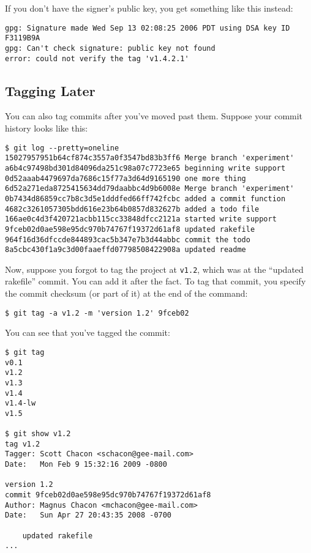 \documentclass[a4paper]{book}
\begin{document}
If you don't have the signer's public key, you get something like this instead:

\begin{shaded}\begin{verbatim}
gpg: Signature made Wed Sep 13 02:08:25 2006 PDT using DSA key ID F3119B9A
gpg: Can't check signature: public key not found
error: could not verify the tag 'v1.4.2.1'
\end{verbatim}\end{shaded}

\subsection{Tagging Later}\label{tagging-later}

You can also tag commits after you've moved past them. Suppose your commit history looks like this:

\begin{shaded}\begin{verbatim}
$ git log --pretty=oneline
15027957951b64cf874c3557a0f3547bd83b3ff6 Merge branch 'experiment'
a6b4c97498bd301d84096da251c98a07c7723e65 beginning write support
0d52aaab4479697da7686c15f77a3d64d9165190 one more thing
6d52a271eda8725415634dd79daabbc4d9b6008e Merge branch 'experiment'
0b7434d86859cc7b8c3d5e1dddfed66ff742fcbc added a commit function
4682c3261057305bdd616e23b64b0857d832627b added a todo file
166ae0c4d3f420721acbb115cc33848dfcc2121a started write support
9fceb02d0ae598e95dc970b74767f19372d61af8 updated rakefile
964f16d36dfccde844893cac5b347e7b3d44abbc commit the todo
8a5cbc430f1a9c3d00faaeffd07798508422908a updated readme
\end{verbatim}\end{shaded}

Now, suppose you forgot to tag the project at \texttt{v1.2}, which was at the “updated rakefile” commit. You can add it after the fact. To tag that commit, you specify the commit checksum (or part of it) at the end of the command:

\begin{shaded}\begin{verbatim}
$ git tag -a v1.2 -m 'version 1.2' 9fceb02
\end{verbatim}\end{shaded}

You can see that you've tagged the commit:

\begin{shaded}\begin{verbatim}
$ git tag
v0.1
v1.2
v1.3
v1.4
v1.4-lw
v1.5

$ git show v1.2
tag v1.2
Tagger: Scott Chacon <schacon@gee-mail.com>
Date:   Mon Feb 9 15:32:16 2009 -0800

version 1.2
commit 9fceb02d0ae598e95dc970b74767f19372d61af8
Author: Magnus Chacon <mchacon@gee-mail.com>
Date:   Sun Apr 27 20:43:35 2008 -0700

    updated rakefile
...
\end{verbatim}\end{shaded}
\end{document}
